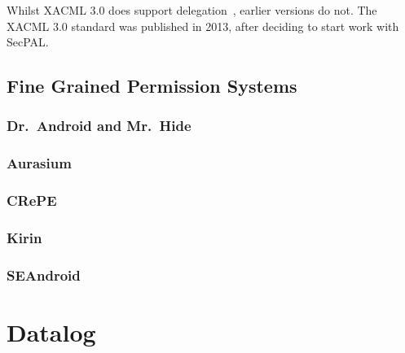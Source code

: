 \documentclass[thesis.tex]{subfiles}
\begin{document}
Whilst XACML 3.0 does support delegation~\cite{oasis_xacml_2010}, earlier
versions do not. The XACML 3.0 standard was published in 2013, after deciding to
start work with SecPAL.


\subsection{Fine Grained Permission Systems}
\subsubsection{Dr.~Android and Mr.~Hide}
\subsubsection{Aurasium}
\subsubsection{CRePE}
\subsubsection{Kirin}
\subsubsection{SEAndroid}

%

\section{Datalog}
\label{ssec:datalog}
\end{document}

